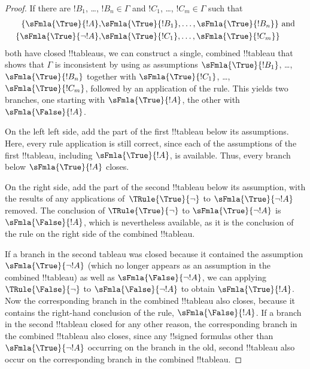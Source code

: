 \documentclass[../../../include/open-logic-section]{subfiles}
\begin{document}
\begin{proof}
  If there are $!B_1$, \dots, $!B_n \in \Gamma$ and $!C_1$, \dots,
  $!C_m \in \Gamma$ such that
  \begin{align*}
    \{\sFmla{\True}{!A}, &
    \sFmla{\True}{!B_1}, \dots, \sFmla{\True}{!B_n}\} \text{ and}\\
    \{\sFmla{\True}{\lnot !A}, &
    \sFmla{\True}{!C_1}, \dots, \sFmla{\True}{!C_m}\}
  \end{align*}
  both have closed !!{tableau}s, we can construct a single, combined
  !!{tableau} that shows that $\Gamma$ is inconsistent by using as
  assumptions $\sFmla{\True}{!B_1}$, \dots, $\sFmla{\True}{!B_n}$
  together with $\sFmla{\True}{!C_1}$, \dots, $\sFmla{\True}{!C_m}$,
  followed by an application of the \Cut{} rule. This yields two
  branches, one starting with $\sFmla{\True}{!A}$, the other with
  $\sFmla{\False}{!A}$.  
  
  On the left left side, add the part of the first
  !!{tableau} below its assumptions. Here, every rule application is still
  correct, since each of the assumptions of the first !!{tableau},
  including $\sFmla{\True}{!A}$, is available. Thus, every branch
  below $\sFmla{\True}{!A}$ closes. 
  
  On the right side, add the part of the second !!{tableau} below its
  assumption, with the results of any applications
  of~$\TRule{\True}{\lnot}$ to $\sFmla{\True}{\lnot !A}$ removed.  The
  conclusion of $\TRule{\True}{\lnot}$ to $\sFmla{\True}{\lnot !A}$ is
  $\sFmla{\False}{!A}$, which is nevertheless available, as it is the
  conclusion of the \Cut{} rule on the right side of the combined !!{tableau}.

  If a branch in the second tableau was closed because it contained
  the assumption $\sFmla{\True}{\lnot !A}$ (which no longer appears as
  an assumption in the combined !!{tableau}) as well as
  $\sFmla{\False}{\lnot !A}$, we can applying $\TRule{\False}{\lnot}$
  to $\sFmla{\False}{\lnot !A}$ to obtain $\sFmla{\True}{!A}$. Now the
  corresponding branch in the combined !!{tableau} also closes,
  because it contains the right-hand conclusion of the \Cut{} rule,
  $\sFmla{\False}{!A}$. If a branch in the second !!{tableau} closed
  for any other reason, the corresponding branch in the combined
  !!{tableau} also closes, since any !!{signed formula}s other than
  $\sFmla{\True}{\lnot !A}$ occurring on the branch in the old, second
  !!{tableau} also occur on the corresponding branch in the combined
  !!{tableau}.
  \end{proof}
\end{document}
